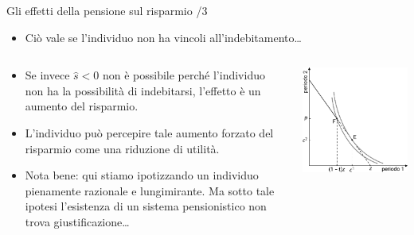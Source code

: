 \documentclass[11pt]{beamer}
\begin{document}
\begin{frame}{Gli effetti della pensione sul risparmio /3}
\begin{itemize}
\item Ciò vale se l'individuo non ha vincoli all'indebitamento\ldots{}
\end{itemize}

\begin{columns}
\begin{column}{.5\columnwidth}
\begin{itemize}
\item Se invece $\hat s<0$ non è possibile perché l'individuo non ha la
possibilità di indebitarsi, l'effetto è un aumento del risparmio.
\item L'individuo può percepire tale aumento forzato del risparmio come una
riduzione di utilità.
\item Nota bene: qui stiamo ipotizzando un \alert{individuo pienamente razionale e
lungimirante}. Ma sotto tale ipotesi l'esistenza di un sistema pensionistico
non trova giustificazione\ldots{}
\end{itemize}
\end{column}

\begin{column}{.5\columnwidth}
\begin{center}
\includegraphics[width=\linewidth]{./figure/effetti-sul-risparmio-4.pdf}
\end{center}
\end{column}
\end{columns}
\end{frame}
\end{document}
